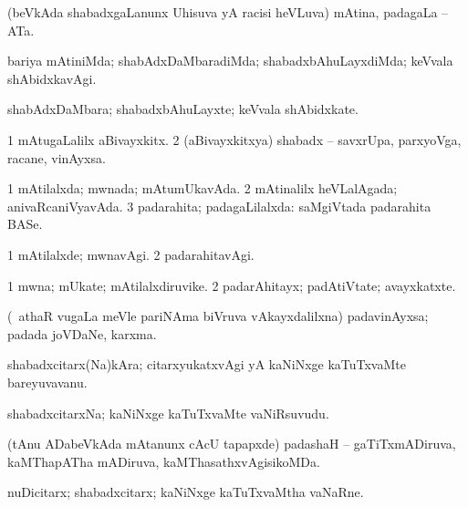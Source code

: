 \bentry
{} 
\gl{\nA}
\expl{}
\bmng
(beVkAda shabadxgaLanunx Uhisuva yA racisi heVLuva) mAtina, padagaLa -- ATa. 
\emng
\eentry

\bentry
{} 
\gl{\kirxvi}
\expl{}
\bmng
bariya mAtiniMda; shabAdxDaMbaradiMda; shabadxbAhuLayxdiMda; keVvala shAbidxkavAgi. 
\emng
\eentry

\bentry
{} 
\gl{\nA}
\expl{}
\bmng
shabAdxDaMbara; shabadxbAhuLayxte; keVvala shAbidxkate. 
\emng
\eentry

\bentry
{} 
\gl{\nA}
\expl{}
\bmng
\bnum
\num{1} mAtugaLalilx aBivayxkitx. 
\num{2} (aBivayxkitxya) shabadx -- savxrUpa, parxyoVga, racane, vinAyxsa. 
\enum
\emng
\eentry

\bentry
{} 
\gl{\gu}
\expl{}
\bmng
\bnum
\num{1} mAtilalxda; mwnada; mAtumUkavAda. 
\num{2} mAtinalilx heVLalAgada; anivaRcaniVyavAda. 
\num{3} padarahita; padagaLilalxda:  saMgiVtada padarahita BASe. 
\enum
\emng
\eentry

\bentry
{} 
\gl{\kirxvi}
\expl{}
\bmng
\bnum
\num{1} mAtilalxde; mwnavAgi. 
\num{2} padarahitavAgi. 
\enum
\emng
\eentry

\bentry
{} 
\gl{\nA}
\expl{}
\bmng
\bnum
\num{1} mwna; mUkate; mAtilalxdiruvike. 
\num{2} padarAhitayx; padAtiVtate; avayxkatxte. 
\enum
\emng
\eentry

\bentry
{} 
\gl{\nA}
\expl{}
\bmng
(\kanmu\ athaR \mo vugaLa meVle pariNAma biVruva vAkayxdalilxna) padavinAyxsa; padada joVDaNe, karxma. 
\emng
\eentry

\bentry
{} 
\gl{\nA}
\expl{}
\bmng
shabadxcitarx(Na)kAra; citarxyukatxvAgi yA kaNiNxge kaTuTxvaMte bareyuvavanu. 
\emng
\eentry

\bentry
{} 
\gl{\nA}
\expl{}
\bmng
shabadxcitarxNa; kaNiNxge kaTuTxvaMte vaNiRsuvudu. 
\emng
\eentry

\bentry
{} 
\gl{\gu}
\expl{}
\bmng
(tAnu ADabeVkAda mAtanunx cAcU tapapxde) padashaH -- gaTiTxmADiruva, kaMThapATha mADiruva, kaMThasathxvAgisikoMDa. 
\emng
\eentry

\bentry
{} 
\gl{\nA}
\expl{}
\bmng
nuDicitarx; shabadxcitarx; kaNiNxge kaTuTxvaMtha vaNaRne. 
\emng
\eentry


